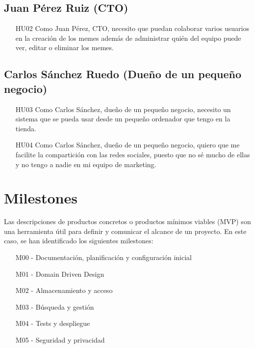     \subsection{Juan Pérez Ruiz (CTO)}

        \begin{enumerate}
            \item [HU02] Como Juan Pérez, CTO, necesito que puedan colaborar varios usuarios en la creación de los memes además de administrar quién del equipo puede ver, editar o eliminar los memes.
        \end{enumerate}

    \subsection{Carlos Sánchez Ruedo (Dueño de un pequeño negocio)}

        \begin{enumerate}
            \item [HU03] Como Carlos Sánchez, dueño de un pequeño negocio, necesito un sistema que se pueda usar desde un pequeño ordenador que tengo en la tienda.
            \item [HU04] Como Carlos Sánchez, dueño de un pequeño negocio, quiero que me facilite la compartición con las redes sociales, puesto que no sé mucho de ellas y no tengo a nadie en mi equipo de marketing.
        \end{enumerate}

\section{Milestones}

Las descripciones de productos concretos o productos mínimos viables (MVP) son una herramienta útil para definir y comunicar el alcance de un proyecto. En este caso, se han identificado los siguientes milestones:

\begin{enumerate}
    \item [M00] - Documentación, planificación y configuración inicial
    \item [M01] - Domain Driven Design
    \item [M02] - Almacenamiento y acceso
    \item [M03] - Búsqueda y gestión
    \item [M04] - Tests y despliegue
    \item [M05] - Seguridad y privacidad
\end{enumerate}